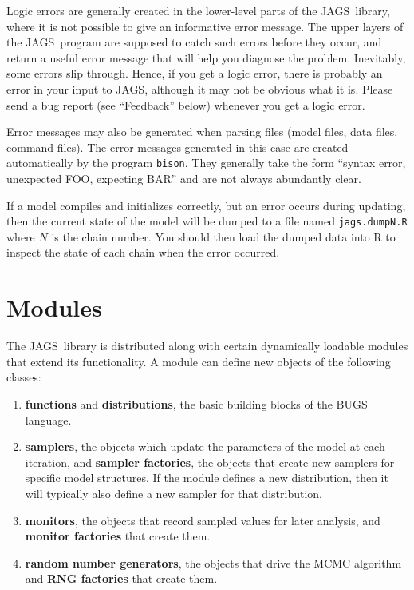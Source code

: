 \documentclass[11pt, a4paper, titlepage]{report}
\newcommand{\JAGS}{\textsf{JAGS}}
\begin{document}
Logic errors are generally created in the lower-level parts of the \JAGS\
library, where it is not possible to give an informative error message.
The upper layers of the \JAGS\ program are supposed to catch such errors
before they occur, and return a useful error message that will help you
diagnose the problem.  Inevitably, some errors slip through. Hence,
if you get a logic error, there is probably an error in your input to
\JAGS, although it may not be obvious what it is. Please send a bug
report (see ``Feedback'' below) whenever you get a logic error.

Error messages may also be generated when parsing files (model files,
data files, command files).  The error messages generated in this case
are created automatically by the program \texttt{bison}. They
generally take the form ``syntax error, unexpected FOO, expecting BAR''
and are not always abundantly clear.

If a model compiles and initializes correctly, but an error occurs
during updating, then the current state of the model will be dumped
to a file named \verb+jags.dumpN.R+ where $N$ is the chain number.
You should then load the dumped data into R to inspect the state of
each chain when the error occurred.

\chapter{Modules}
\label{section:modules}

The \JAGS\  library is distributed along with certain dynamically
loadable modules that extend its functionality. A module can define
new objects of the following classes:
\begin{enumerate}
\item {\bf functions} and {\bf distributions}, the basic building
blocks of the BUGS language.
\item {\bf samplers}, the objects which update the parameters of the
model at each iteration, and {\bf sampler factories}, the objects that 
create new samplers for specific model structures.  If the module
defines a new distribution, then it will typically also define a new
sampler for that distribution.
\item {\bf monitors}, the objects that record sampled values for
later analysis, and {\bf monitor factories} that create them. 
\item {\bf random number generators}, the objects that drive the
MCMC algorithm and {\bf RNG factories} that create them.
\end{enumerate}
\end{document}
